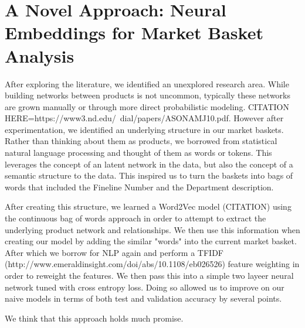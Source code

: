 \documentclass{article} %
\begin{document}
\section{A Novel Approach: Neural Embeddings for Market Basket Analysis}

After exploring the literature, we identified an unexplored research area. While building networks between products is not uncommon, typically these networks are grown manually or through more direct probabilistic modeling. CITATION HERE=https://www3.nd.edu/~dial/papers/ASONAMJ10.pdf. However after experimentation, we identified an underlying structure in our market baskets. Rather than thinking about them as products, we borrowed from statistical natural language processing and thought of them as words or tokens. This leverages the concept of an latent network in the data, but also the concept of a semantic structure to the data. This inspired us to turn the baskets into bags of words that included the Fineline Number and the Department description.

After creating this structure, we learned a Word2Vec model (CITATION) using the continuous bag of words approach in order to attempt to extract the underlying product network and relationships. We then use this information when creating our model by adding the similar "words" into the current market basket. After which we borrow for NLP again and perform a TFIDF (http://www.emeraldinsight.com/doi/abs/10.1108/eb026526) feature weighting in order to reweight the features. We then pass this into a simple two layeer neural network tuned with cross entropy loss. Doing so allowed us to improve on our naive models in terms of both test and validation accuracy by several points.

We think that this approach holds much promise.
\end{document}
